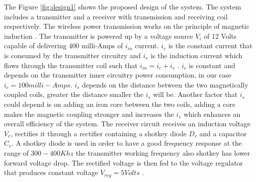 The Figure \ref{fig:design1} shows the proposed design of the system. The system includes a transmitter and a receiver with transmission and receiving coil respectively. The wireless power transmission works on the principle of magnetic induction \cite{IAmp}. The transmitter is powered up by a voltage source $V_i$ of 12 Volts capable of delivering 400 milli-Amps of $i_{in}$ current. $i_c$ is the constant current that is consumed by the transmitter circuitry and $i_s$ is the induction current which flows through the transmitter coil such that $i_{in} = i_c + i_s$ . $i_c$ is constant and depends on the transmitter inner circuitry power consumption, in our case $i_c = 100 milli-Amps $. $i_s$ depends on the distance between the two magnetically coupled coils, greater the distance smaller the $i_s$ will be. Another factor that $i_s$ could depend is on adding an iron core between the two coils, adding a core makes the magnetic coupling stronger and increases the $i_s$ which enhances an overall efficiency of the system.
The receiver circuit receives an induction voltage $V_r$, rectifies it through a rectifier containing a shotkey diode $D_r$ and a capacitor $C_r$. A shotkey diode is used in order to have a good frequency response at the range of $ 300-400 Khz$ the transmitter working frequency also shotkey has lower forward voltage drop. The rectified voltage is then fed to the voltage regulator that produces constant voltage $V_{reg} = 5 Volts$ .